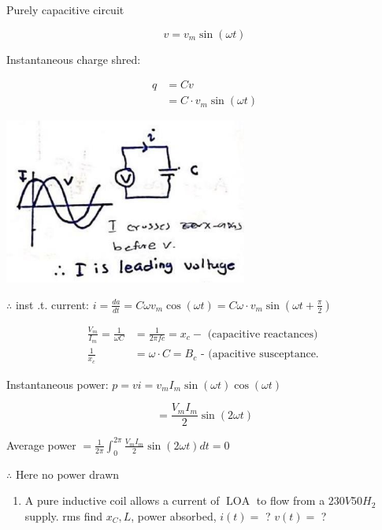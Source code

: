 \documentclass[12pt, a4paper]{article}
\newcommand{\figwidth}{8cm}
\begin{document}
	Purely capacitive circuit

	$$
		v=v_{m} \sin (\omega t)
	$$

	Instantaneous charge shred:

	$$
		\begin{aligned}
			q & =C v                           \\
			  & =C \cdot v_{m} \sin (\omega t)
		\end{aligned}
	$$

	\begin{center}
		\includegraphics[max width=\figwidth]{2024_06_15_74bbabba7981675b0d49g-06}
	\end{center}

$\therefore$ inst .t. current: $i=\frac{d a}{d t}=C \omega v_{m} \cos (\omega t)=C \omega \cdot v_{m} \sin \left(\omega t+\frac{\pi}{2}\right)$

	$$
		\begin{aligned}
			\frac{V_{m}}{I_{m}}=\frac{1}{\omega C} & =\frac{1}{2 \pi f c}=x_{c}-\text { (capacitive reactances) } \\
			\frac{1}{x_{c}}                        & =\omega \cdot C=B_{c} \text { - (apacitive susceptance. }
		\end{aligned}
	$$

	Instantaneous power: $p=v i=v_{m} I_{m} \sin (\omega t) \cos (\omega t)$

	$$
		=\frac{V_{m} I_{m}}{2} \sin (2 \omega t)
	$$

	Average power $=\frac{1}{2 \pi} \int_{0}^{2 \pi} \frac{V_{m} I_{m}}{2} \sin (2 \omega t) d t=0$

$\therefore$ Here no power drawn

	\begin{enumerate}
		\item A pure inductive coil allows a current of $\operatorname{LOA}$ to flow from a $230 V 50 H_{2}$ supply. rms find $x_{C}, L$, power absorbed, $i(t)=$ ? $v(t)=$ ?
	\end{enumerate}
\end{document}
